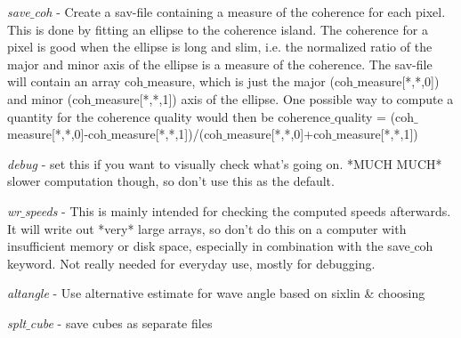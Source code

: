 \documentclass{article}
\begin{document}
\textit{save$\_$coh}        - Create a sav-file containing a measure of
                  the coherence for each pixel. This is done
                  by fitting an ellipse to the coherence
                  island. The coherence for a pixel is good 
                  when the ellipse is long and slim, i.e.
                  the normalized ratio of the major and minor
                  axis of the ellipse is a measure of the
                  coherence. The sav-file will contain an
                  array coh$\_$measure, which is just the major
                  (coh$\_$measure[*,*,0]) and minor
                  (coh$\_$measure[*,*,1]) axis of the ellipse. 
                  One possible way to compute a quantity for 
                  the coherence quality would then be
                   coherence$\_$quality = (coh$\_$measure[*,*,0]-coh$\_$measure[*,*,1])/(coh$\_$measure[*,*,0]+coh$\_$measure[*,*,1])\\
\smallskip

\textit{debug}            - set this if you want to visually
                  check what's going on. *MUCH MUCH*
                  slower computation though, so don't
                  use this as the default.\\
\smallskip

\textit{wr$\_$speeds}        - This is mainly intended for checking the
                  computed speeds afterwards. It will write
                  out *very* large arrays, so don't
                  do this on a computer with insufficient
                  memory or disk space, especially in
                  combination with the save$\_$coh keyword. Not
                  really needed for everyday use, mostly for
                  debugging. \\
\smallskip

\textit{altangle} - Use alternative estimate for wave angle based on 
           sixlin \& choosing \\
\smallskip

\textit{splt$\_$cube} - save cubes as separate files\\
\end{document}
